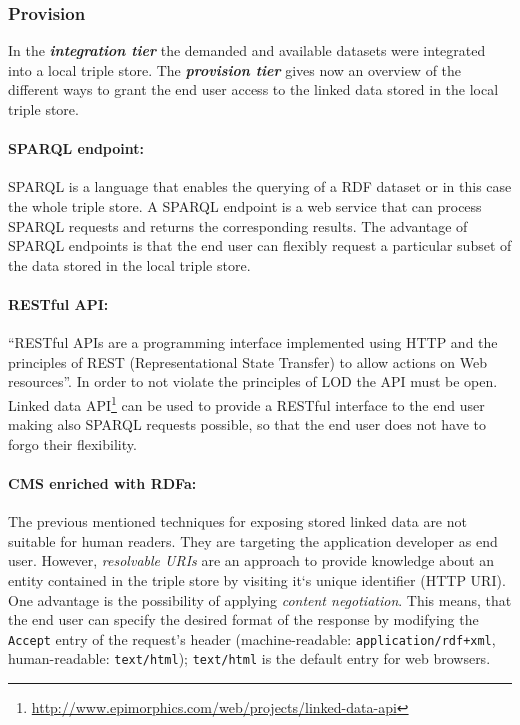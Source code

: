 \documentclass{article}
\begin{document}
\subsubsection{Provision}
\label{technical-architecture-challenges:proposal:provision}
In the \textit{\textbf{integration tier}} the demanded and available datasets were integrated into a local triple store. The \textit{\textbf{provision tier}} gives now an overview of the different ways to grant the end user access to the linked data stored in the local triple store.

\paragraph{SPARQL endpoint:} SPARQL is a language that enables the querying of a RDF dataset or in this case the whole triple store. A SPARQL endpoint is a web service that can process SPARQL requests and returns the corresponding results. The advantage of SPARQL endpoints is that the end user can flexibly request a particular subset of the data stored in the local triple store.

\paragraph{RESTful API:} \enquote{RESTful APIs are a programming interface implemented using HTTP and the principles of REST (Representational State Transfer) to allow actions on Web resources}.\cite{hyland_linked_????}
In order to not violate the principles of LOD the API must be open. Linked data API\footnote{\url{http://www.epimorphics.com/web/projects/linked-data-api}} can be used to provide a RESTful interface to the end user making also SPARQL requests possible, so that the end user does not have to forgo their flexibility.

\paragraph{CMS enriched with RDFa:} The previous mentioned techniques for exposing stored linked data are not suitable for human readers. They are targeting the application developer as end user. However,  \textit{resolvable URIs} are an approach to provide knowledge about an entity contained in the triple store by visiting it`s unique identifier (HTTP URI). One advantage is the possibility of applying \textit{content negotiation}. This means, that the end user can specify the desired format of the response by modifying the \texttt{Accept} entry of the request's header (machine-readable: \texttt{application/rdf+xml}, human-readable: \texttt{text/html}); \texttt{text/html} is the default entry for web browsers.
\end{document}
